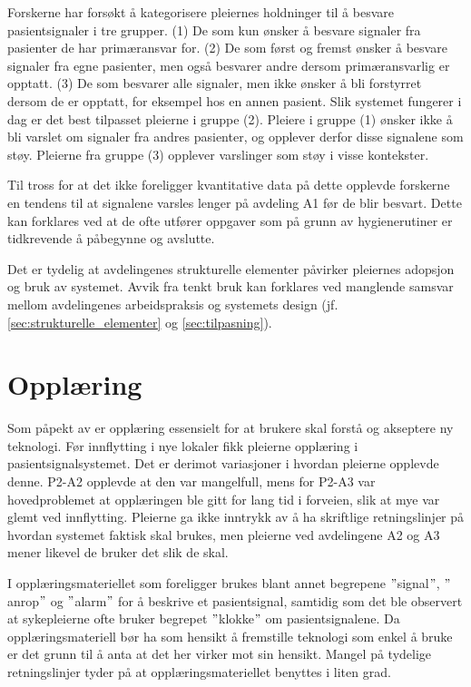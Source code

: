 \noindent
Forskerne har forsøkt å kategorisere pleiernes holdninger til å besvare pasientsignaler i tre grupper. (1) De som kun ønsker å besvare signaler fra pasienter de har primæransvar for. (2) De som  først og fremst ønsker å besvare signaler fra egne pasienter, men også besvarer andre dersom primæransvarlig er opptatt. (3) De som besvarer alle signaler, men ikke ønsker å bli forstyrret dersom de er opptatt, for eksempel hos en annen pasient. Slik systemet fungerer i dag er det best tilpasset pleierne i gruppe (2). Pleiere i gruppe (1) ønsker ikke å bli varslet om signaler fra andres pasienter, og opplever derfor disse signalene som støy. Pleierne fra gruppe (3) opplever varslinger som støy i visse kontekster.

\noindent
Til tross for at det ikke foreligger kvantitative data på dette opplevde forskerne en tendens til at signalene varsles lenger på avdeling A1 før de blir besvart. Dette kan forklares ved at de ofte utfører oppgaver som på grunn av hygienerutiner er tidkrevende å påbegynne og avslutte. 

\noindent
Det er tydelig at avdelingenes strukturelle elementer påvirker pleiernes adopsjon og bruk av systemet. Avvik fra tenkt bruk kan forklares ved manglende samsvar mellom avdelingenes arbeidspraksis og systemets design (jf. \ref{sec:strukturelle_elementer} og \ref{sec:tilpasning}). 

\section{Opplæring}
Som påpekt av \citet{Venkatesh99} er opplæring essensielt for at brukere skal forstå og akseptere ny teknologi. Før innflytting i nye lokaler fikk pleierne opplæring i pasientsignalsystemet. Det er derimot variasjoner i hvordan pleierne opplevde denne. P2-A2 opplevde at den var mangelfull, mens for P2-A3 var hovedproblemet at opplæringen ble gitt for lang tid i forveien, slik at mye var glemt ved innflytting. Pleierne ga ikke inntrykk av å ha skriftlige retningslinjer på hvordan systemet faktisk skal brukes, men pleierne ved avdelingene A2 og A3 mener likevel de bruker det slik de skal. 

\noindent
I opplæringsmateriellet som foreligger brukes blant annet begrepene $"$signal$"$, $"$anrop$"$ og $"$alarm$"$ for å beskrive et pasientsignal, samtidig som det ble observert at sykepleierne ofte bruker begrepet $"$klokke$"$ om pasientsignalene. Da opplæringsmateriell bør ha som hensikt å fremstille teknologi som enkel å bruke er det grunn til å anta at det her virker mot sin hensikt. Mangel på tydelige retningslinjer tyder på at opplæringsmateriellet benyttes i liten grad. 

